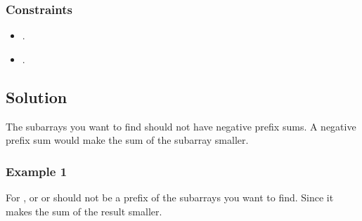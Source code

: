\documentclass[letterpaper,12pt,english]{book}
\begin{document}
\subsubsection{Constraints}
\label{\detokenize{Prefix_Sum/53_Maximum_Subarray:constraints}}\begin{itemize}
\item {} 
\sphinxAtStartPar
{}.

\item {} 
\sphinxAtStartPar
{}.

\end{itemize}


\subsection{Solution}
\label{\detokenize{Prefix_Sum/53_Maximum_Subarray:solution}}
\sphinxAtStartPar
The subarrays you want to find should not have negative prefix sums. A negative prefix sum would make the sum of the subarray smaller.


\subsubsection{Example 1}
\label{\detokenize{Prefix_Sum/53_Maximum_Subarray:id1}}
\sphinxAtStartPar
For , \sphinxcode{\sphinxupquote{{[}\sphinxhyphen{}2{]}}} or \sphinxcode{\sphinxupquote{{[}\sphinxhyphen{}2,1{]}}} or  should not be a prefix of the  subarrays you want to find. Since it makes the sum of the result smaller.
\end{document}
